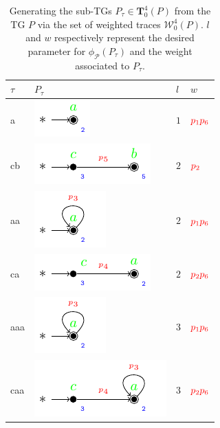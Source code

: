 \begin{table}[!t]
	\caption{Generating the sub-TGs $P_\tau\in \mathbf{T}_0^4(P)$ from the TG $P$ via the set of weighted traces $\mathcal{W}_0^4(P)$. $l$ and $w$ respectively represent the desired parameter for $\phi_{\mathcal{P}}(P_\tau)$ and the weight associated to $P_\tau$.}\label{tab:proj}
	\centering
	\begin{tabular}{>{\centering\arraybackslash} m{1cm}| >{\centering\arraybackslash} m{4cm} >{\centering\arraybackslash} m{1cm} >{\centering\arraybackslash} m{1cm} }
		\toprule
		$\tau$&$P_\tau$&$l$&$w$\\
		\midrule
		a & \includegraphics{images/trace_a} & $1$ & $\color{red}p_1p_6$\\   
		cb & \includegraphics{images/trace_cb} & $2$ & $\color{red}p_2$\\
		aa & \includegraphics{images/trace_a_loop} & $2$ & $\color{red}p_1p_6$\\ 
		ca & \includegraphics{images/trace_ca} & $2$ & $\color{red}p_2p_6$\\ 
		aaa & \includegraphics{images/trace_a_loop} & $3$ & $\color{red}p_1p_6$\\ 
		caa & \includegraphics{images/trace_ca_loop} & $3$ & $\color{red}p_2p_6$\\  

\end{tabular}
\end{table}
